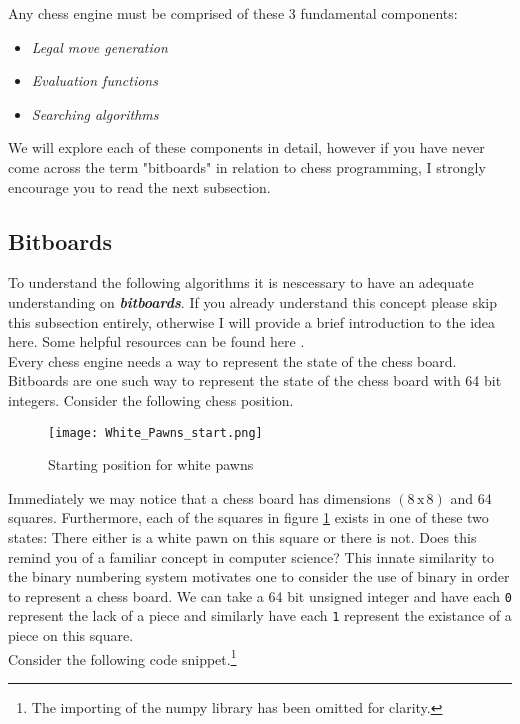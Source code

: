 Any chess engine must be comprised of these 3 fundamental components:
\begin{itemize}
  \item \textit{Legal move generation}
  \item \textit{Evaluation functions}
  \item \textit{Searching algorithms}\\
\end{itemize}

We will explore each of these components in detail, however 
if you have never come across the term "bitboards" in 
relation to chess programming, I strongly 
encourage you to read the next subsection.

\subsection*{Bitboards}
To understand the following algorithms it is nescessary to 
have an adequate understanding on \textbf{\textit{bitboards}}.
If you already understand this concept please skip this 
subsection entirely, otherwise I will provide a brief 
introduction to the idea here. Some helpful resources can be
found here \cite{bitboards}.\\

Every chess engine needs a way to represent the state of the
chess board. Bitboards are one such way to represent the
state of the chess board with 64 bit integers. Consider
the following chess position.

\begin{figure}[h]
  \texttt{[image: White\_Pawns\_start.png]}
  \centering
  \caption{Starting position for white pawns}
  \label{whitepawns}
\end{figure}

Immediately we may notice that a chess board has dimensions
$(8 \, \textrm{x} \, 8)$ and 64 squares. Furthermore, 
each of the squares in figure \ref{whitepawns} exists 
in one of these two states: There either is a white pawn on
this square or there is not. Does this remind you of a 
familiar concept in computer science? This innate similarity to 
the binary numbering system motivates one to consider the 
use of binary in order to represent a chess board. We can take a 
64 bit unsigned integer and have each \texttt{0} 
represent the lack of a piece and similarly 
have each \texttt{1} represent the existance of a piece on 
this square.\\

Consider the following code snippet.\footnote{The importing
of the numpy library has been omitted for clarity.}

